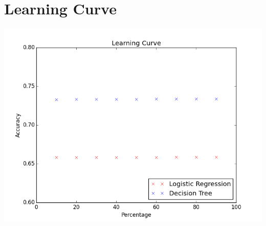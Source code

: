 \documentclass{article}
\begin{document}
\section{Learning Curve}
\includegraphics[width =\linewidth]{learningcurve.png}
\end{document}
